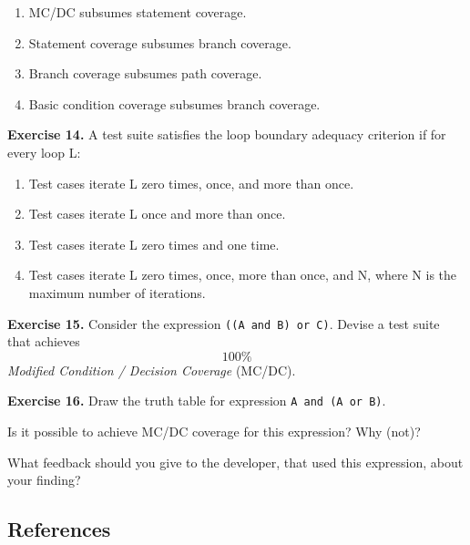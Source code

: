 \begin{enumerate}
\def\labelenumi{\arabic{enumi}.}
\tightlist
\item
  MC/DC subsumes statement coverage.
\item
  Statement coverage subsumes branch coverage.
\item
  Branch coverage subsumes path coverage.
\item
  Basic condition coverage subsumes branch coverage.
\end{enumerate}

\textbf{Exercise 14.} A test suite satisfies the loop boundary adequacy
criterion if for every loop L:

\begin{enumerate}
\def\labelenumi{\arabic{enumi}.}
\tightlist
\item
  Test cases iterate L zero times, once, and more than once.
\item
  Test cases iterate L once and more than once.
\item
  Test cases iterate L zero times and one time.
\item
  Test cases iterate L zero times, once, more than once, and N, where N
  is the maximum number of iterations.
\end{enumerate}

\textbf{Exercise 15.} Consider the expression
\texttt{((A\ and\ B)\ or\ C)}. Devise a test suite that achieves
\[100\%\] \emph{Modified Condition / Decision Coverage} (MC/DC).

\textbf{Exercise 16.} Draw the truth table for expression
\texttt{A\ and\ (A\ or\ B)}.

Is it possible to achieve MC/DC coverage for this expression? Why (not)?

What feedback should you give to the developer, that used this
expression, about your finding?

\hypertarget{references}{%
\subsection{References}\label{references}}

